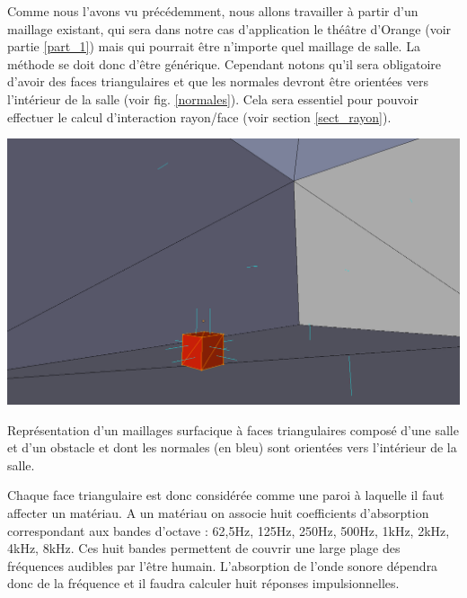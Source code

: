 Comme nous l'avons vu précédemment, nous allons travailler à partir d'un maillage existant, qui sera dans notre cas d'application le théâtre d'Orange (voir partie \ref{part_1}) mais qui pourrait être n'importe quel maillage de salle. La méthode se doit donc d'être générique. Cependant notons qu'il sera obligatoire d'avoir des faces triangulaires et que les normales devront être orientées vers l'intérieur de la salle (voir fig. \ref{normales}). Cela sera essentiel pour pouvoir effectuer le calcul d'interaction rayon/face (voir section \ref{sect_rayon}).

\begin{figureth}
	\includegraphics[width=0.8\linewidth]{images/normales}
	\caption{Représentation d'un maillages surfacique à faces triangulaires composé d'une salle et d'un obstacle et dont les normales (en bleu) sont orientées vers l'intérieur de la salle.}
	\label{normales}
\end{figureth}

Chaque face triangulaire est donc considérée comme une paroi à laquelle il faut affecter un matériau. A un matériau on associe huit coefficients d'absorption correspondant aux bandes d'octave : 62,5Hz, 125Hz, 250Hz, 500Hz, 1kHz, 2kHz, 4kHz, 8kHz. Ces huit bandes permettent de couvrir une large plage des fréquences audibles par l'être humain. L'absorption de l'onde sonore dépendra donc de la fréquence et il faudra calculer huit réponses impulsionnelles. 

